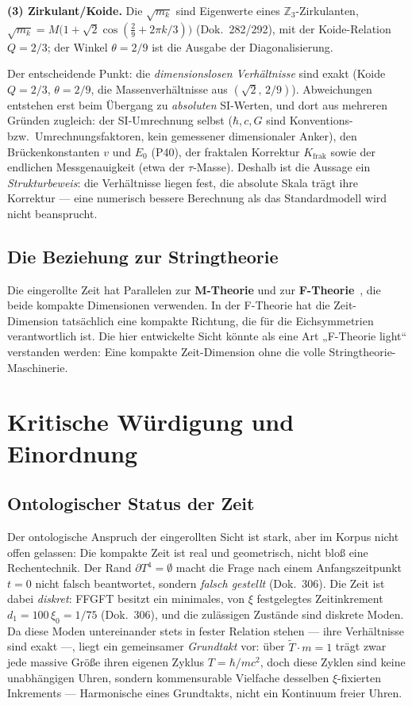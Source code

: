 \documentclass[11pt,a4paper]{article}
\begin{document}
\textbf{(3) Zirkulant/Koide.} Die $\sqrt{m_k}$ sind Eigenwerte eines $\mathbb{Z}_3$-Zirkulanten, $\sqrt{m_k}=M\bigl(1+\sqrt2\cos(\tfrac29+2\pi k/3)\bigr)$ (Dok.~282/292), mit der Koide-Relation $Q=2/3$; der Winkel $\theta=2/9$ ist die Ausgabe der Diagonalisierung.

Der entscheidende Punkt: die \emph{dimensionslosen Verhältnisse} sind exakt (Koide $Q=2/3$, $\theta=2/9$, die Massenverhältnisse aus $(\sqrt2,\,2/9)$). Abweichungen entstehen erst beim Übergang zu \emph{absoluten} SI-Werten, und dort aus mehreren Gründen zugleich: der SI-Umrechnung selbst ($\hbar,c,G$ sind Konventions- bzw.\ Umrechnungsfaktoren, kein gemessener dimensionaler Anker), den Brückenkonstanten $v$ und $E_0$ (P40), der fraktalen Korrektur $K_{\text{frak}}$ sowie der endlichen Messgenauigkeit (etwa der $\tau$-Masse). Deshalb ist die Aussage ein \emph{Strukturbeweis}: die Verhältnisse liegen fest, die absolute Skala trägt ihre Korrektur --- eine numerisch bessere Berechnung als das Standardmodell wird nicht beansprucht.

\subsection{Die Beziehung zur Stringtheorie}

Die eingerollte Zeit hat Parallelen zur \textbf{M-Theorie} und zur \textbf{F-Theorie}~\cite{Vafa1996}, die beide kompakte Dimensionen verwenden. In der F-Theorie hat die Zeit-Dimension tatsächlich eine kompakte Richtung, die für die Eichsymmetrien verantwortlich ist. Die hier entwickelte Sicht könnte als eine Art „F-Theorie light`` verstanden werden: Eine kompakte Zeit-Dimension ohne die volle Stringtheorie-Maschinerie.

\section{Kritische Würdigung und Einordnung}

\subsection{Ontologischer Status der Zeit}

Der ontologische Anspruch der eingerollten Sicht ist stark, aber im Korpus nicht offen gelassen: Die kompakte Zeit ist real und geometrisch, nicht bloß eine Rechentechnik. Der Rand $\partial T^4 = \emptyset$ macht die Frage nach einem Anfangszeitpunkt $t=0$ nicht falsch beantwortet, sondern \emph{falsch gestellt} (Dok.~306). Die Zeit ist dabei \emph{diskret}: FFGFT besitzt ein minimales, von $\xi$ festgelegtes Zeitinkrement $d_1 = 100\,\xi_0 = 1/75$ (Dok.~306), und die zulässigen Zustände sind diskrete Moden. Da diese Moden untereinander stets in fester Relation stehen --- ihre Verhältnisse sind exakt ---, liegt ein gemeinsamer \emph{Grundtakt} vor: über $\tilde T\cdot m = 1$ trägt zwar jede massive Größe ihren eigenen Zyklus $T=\hbar/mc^2$, doch diese Zyklen sind keine unabhängigen Uhren, sondern kommensurable Vielfache desselben $\xi$-fixierten Inkrements --- Harmonische eines Grundtakts, nicht ein Kontinuum freier Uhren.
\end{document}
